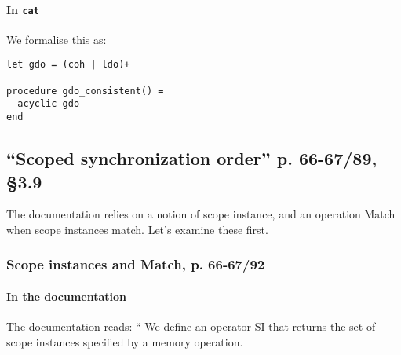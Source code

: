 \documentclass[a4paper]{article}
\begin{document}
\paragraph{In {\tt cat}}
We formalise this as: 
\begin{verbatim}
let gdo = (coh | ldo)+

procedure gdo_consistent() =
  acyclic gdo
end
\end{verbatim} 

\subsection{``Scoped synchronization order'' p. 66-67/89, \S 3.9}

The documentation relies on a notion of scope instance, and an operation Match
when scope instances match. Let's examine these first.

\subsubsection{Scope instances and Match, p. 66-67/92 \label{sec:match}}

\paragraph{In the documentation}
The documentation reads: 
``
We define an operator SI that returns the set of scope instances specified by a
memory operation.
\end{document}
